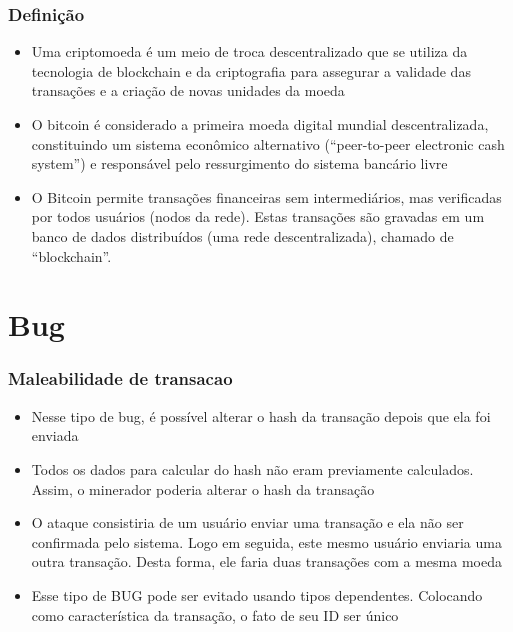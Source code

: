 \documentclass{beamer}
\begin{document}
\begin{frame}
  \frametitle{Definição}
\begin{itemize}
    \item Uma criptomoeda é um meio de troca descentralizado que se utiliza da tecnologia
      de blockchain e da criptografia para assegurar a validade das transações e a criação de novas unidades da moeda
    \item O bitcoin é considerado a primeira moeda digital mundial descentralizada,
      constituindo um sistema econômico alternativo (\foreignquote{english}{peer-to-peer electronic cash system})
      e responsável pelo ressurgimento do sistema bancário livre
      \cite{nakamoto2008bitcoin}
    \item O Bitcoin permite transações financeiras sem intermediários,
      mas verificadas por todos usuários (nodos da rede).
      Estas transações são gravadas em um banco de dados distribuídos (uma rede descentralizada),
      chamado de \foreignquote{english}{blockchain}.
    \end{itemize}
\end{frame}

\section{Bug}

 \begin{frame}
   \frametitle{Maleabilidade de transacao}
\begin{itemize}
  \item Nesse tipo de bug, é possível alterar o hash da transação depois que ela foi enviada
  \item Todos os dados para calcular do hash não eram previamente calculados. Assim, o minerador poderia alterar o hash da transação
  \item O ataque consistiria de um usuário enviar uma transação e ela não ser confirmada pelo sistema.
    Logo em seguida, este mesmo usuário enviaria uma outra transação. Desta forma, ele faria duas transações com a mesma moeda
  \item Esse tipo de BUG pode ser evitado usando tipos dependentes.
    Colocando como característica da transação, o fato de seu ID ser único
\end{itemize}
\end{frame}
\end{document}
